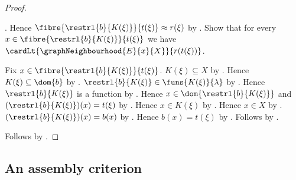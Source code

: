 \begin{proof}
\begin{subproof}
            .
        Hence $\fibre{\restrl{b}{K(\xi)}}{t(\xi)}\approx r(\xi)$ by
            .
        Show that for every
            $x\in\fibre{\restrl{b}{K(\xi)}}{t(\xi)}$ we have
            $\cardLt{\graphNeighbourhood{E}{x}{X}}{r(t(\xi))}$.
        \begin{subproof}
            Fix $x\in\fibre{\restrl{b}{K(\xi)}}{t(\xi)}$.
            $K(\xi)\subseteq X$ by
                .
            Hence $K(\xi)\subseteq\dom{b}$ by \auto.
            $\restrl{b}{K(\xi)}\in\funs{K(\xi)}{\lambda}$ by
                \auto.
            Hence $\restrl{b}{K(\xi)}$ is a function by
                .
            Hence $x\in\dom{\restrl{b}{K(\xi)}}$ and
                $(\restrl{b}{K(\xi)})(x)=t(\xi)$ by
                .
            Hence $x\in K(\xi)$ by
                .
            Hence $x\in X$ by .
            $(\restrl{b}{K(\xi)})(x)=b(x)$ by
                .
            Hence $b(x)=t(\xi)$ by \auto.
            Follows by \auto.
        \end{subproof}
    \end{subproof}
    Follows by \auto.
\end{proof}

\subsection{An assembly criterion}

